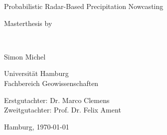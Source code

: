 \documentclass[11pt,twoside,a4paper,fleqn]{report}
\numberwithin{equation}{chapter}
\numberwithin{figure}{chapter}
\numberwithin{table}{chapter}
\begin{document}
	\thispagestyle{empty}
	\begin{center}
		\hspace*{0pt}\vfill
		\begin{Huge}
			Probabilistic Radar-Based Precipitation Nowcasting
		\end{Huge}
		\vfill
		\begin{minipage}{0.5\textwidth}
			\centering
				\begin{large}
					Masterthesis by
				\end{large}
				\\\vspace{0.5cm}
				\begin{huge}
					Simon Michel
				\end{huge}
		\end{minipage}
		\vfill
		
		\begin{minipage}{0.5\textwidth}
			\centering
				\begin{large}
					Universität Hamburg\\
					Fachbereich Geowissenschaften
				\end{large}
		\end{minipage}
		\vfill
		
		\begin{minipage}{0.5\textwidth}
			\centering
				\begin{large}
					Erstgutachter: Dr. Marco Clemens\\
					Zweitgutachter: Prof. Dr. Felix Ament
				\end{large}
		\end{minipage}
		\vfill
		\begin{minipage}{0.5\textwidth}
			\centering
				\begin{large}
					Hamburg, \today
				\end{large}
		\end{minipage}
		\vfill
	\end{center}
	
\end{document}
